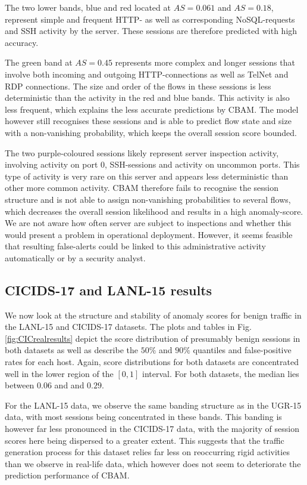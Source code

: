 The two lower bands, blue and red located at $AS=0.061$ and $AS=0.18$, represent simple and frequent HTTP- as well as corresponding NoSQL-requests and SSH activity by the server. These sessions are therefore predicted with high accuracy. 

The green band at $AS=0.45$ represents more complex and longer sessions that involve both incoming and outgoing HTTP-connections as well as TelNet and RDP connections. The size and order of the flows in these sessions is less deterministic than the activity in the red and blue bands. This activity is also less frequent, which explains the less accurate predictions by CBAM. The model however still recognises these sessions and is able to predict flow state and size with a non-vanishing probability, which keeps the overall session score bounded.

The two purple-coloured sessions likely represent server inspection activity, involving activity on port 0, SSH-sessions and activity on uncommon ports. This type of activity is very rare on this server and appears less deterministic than other more common activity. CBAM therefore fails to recognise the session structure and is not able to assign non-vanishing probabilities to several flows, which decreases the overall session likelihood and results in a high anomaly-score. We are not aware how often server are subject to inspections and whether this would present a problem in operational deployment. However, it seems feasible that resulting false-alerts could be linked to this administrative activity automatically or by a security analyst.

\subsection{CICIDS-17 and LANL-15 results}

We now look at the structure and stability of anomaly scores for benign traffic in the LANL-15 and CICIDS-17 datasets. 
The plots and tables in Fig. \ref{fig:CICrealresults} depict the score distribution of presumably benign sessions in both datasets as well as describe the $50\%$ and $90\%$ quantiles and false-positive rates for each host. Again, score distributions for both datasets are concentrated well in the lower region of the $[0,1]$ interval. For both datasets, the median lies between $0.06$ and and $0.29$.

For the LANL-15 data, we observe the same banding structure as in the UGR-15 data, with most sessions being concentrated in these bands. This banding is however far less pronounced in the CICIDS-17 data, with the majority of session scores here being dispersed to a greater extent. This suggests that the traffic generation process for this dataset relies far less on reoccurring rigid activities than we observe in real-life data, which however does not seem to deteriorate the prediction performance of CBAM. 


